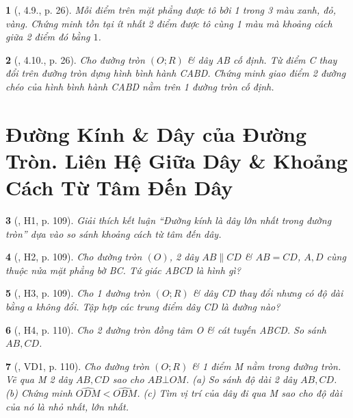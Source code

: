 \documentclass{article}
\newtheorem{baitoan}{}
\begin{document}
\begin{baitoan}[\cite{TLCT_THCS_Toan_9_hinh_hoc}, 4.9., p. 26]
	Mỗi điểm trên mặt phẳng được tô bởi 1 trong 3 màu xanh, đỏ, vàng. Chứng minh tồn tại ít nhất 2 điểm được tô cùng 1 màu mà khoảng cách giữa 2 điểm đó bằng $1$.
\end{baitoan}

\begin{baitoan}[\cite{TLCT_THCS_Toan_9_hinh_hoc}, 4.10., p. 26]
	Cho đường tròn $(O;R)$ \& dây AB cố định. Từ điểm C thay đổi trên đường tròn dựng hình bình hành CABD. Chứng minh giao điểm 2 đường chéo của hình bình hành CABD nằm trên 1 đường tròn cố định.
\end{baitoan}


\section{Đường Kính \& Dây của Đường Tròn. Liên Hệ Giữa Dây \& Khoảng Cách Từ Tâm Đến Dây}

\begin{baitoan}[\cite{Binh_boi_duong_Toan_9_tap_1}, H1, p. 109]
	Giải thích kết luận ``Đường kính là dây lớn nhất trong đường tròn'' dựa vào so sánh khoảng cách từ tâm đến dây.
\end{baitoan}

\begin{baitoan}[\cite{Binh_boi_duong_Toan_9_tap_1}, H2, p. 109]
	Cho đường tròn $(O)$, 2 dây $AB\parallel CD$ \& $AB = CD$, $A,D$ cùng thuộc nửa mặt phẳng bờ BC. Tứ giác ABCD là hình gì?
\end{baitoan}

\begin{baitoan}[\cite{Binh_boi_duong_Toan_9_tap_1}, H3, p. 109]
	Cho 1 đường tròn $(O;R)$ \& dây CD thay đổi nhưng có độ dài bằng $a$ không đổi. Tập hợp các trung điểm dây CD là đường nào?
\end{baitoan}

\begin{baitoan}[\cite{Binh_boi_duong_Toan_9_tap_1}, H4, p. 110]
	Cho 2 đường tròn đồng tâm O \& cát tuyến ABCD. So sánh $AB,CD$.
\end{baitoan}

\begin{baitoan}[\cite{Binh_boi_duong_Toan_9_tap_1}, VD1, p. 110]
	Cho đường tròn $(O;R)$ \& 1 điểm M nằm trong đường tròn. Vẽ qua M 2 dây $AB,CD$ sao cho $AB\bot OM$. (a) So sánh độ dài 2 dây $AB,CD$. (b) Chứng minh $\widehat{ODM} < \widehat{OBM}$. (c) Tìm vị trí của dây đi qua M sao cho độ dài của nó là nhỏ nhất, lớn nhất.
\end{baitoan}
\end{document}

